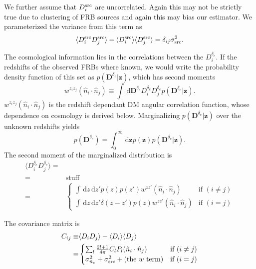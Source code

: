 \documentclass[twocolumn,prd,noshowpacs,nofootinbib,amsmath,amssymb]{revtex4}
\newcommand{\ud}{\,\mathrm{d}}
\begin{document}
We further assume that $D^{\rm src}_i$ are uncorrelated. Again this may not
be strictly true due to clustering of FRB sources and again this may bias our
estimator. We parameterized the variance from this term as 
\begin{equation}
    \langle D^{\rm src}_i D^{\rm src}_j \rangle
    - \langle D^{\rm src}_i \rangle \langle D^{\rm src}_j \rangle
    = \delta_{ij} \sigma^2_{\rm src}.
\end{equation}

The cosmological information lies in the correlations between the
$D^{\delta_e}_i$. If the redshifts of the observed FRBs where known, we
would write the probability density function of this set as
$p(\boldsymbol D^{\delta_e} | \boldsymbol z)$, which has second moments
\begin{equation}
    w^{z_i z_j}(\hat{n}_i\cdot\hat{n}_j) \equiv \int \ud \boldsymbol D^{\delta_e}
        D^{\delta_e}_i D^{\delta_e}_j p(\boldsymbol D^{\delta_e} | \boldsymbol z).
\end{equation}
$w^{z_i z_j}(\hat{n}_i\cdot\hat{n}_j)$ is the redshift dependant DM angular
correlation function, whose dependence on cosmology is derived below.
Marginalizing $p(\boldsymbol D^{\delta_e} | \boldsymbol z)$ over the unknown redshifts
yields
\begin{equation}
    p(\boldsymbol D^{\delta_e}) = \int_0^\infty \ud \boldsymbol z
        p(\boldsymbol z) p(\boldsymbol D^{\delta_e} | \boldsymbol z).
\end{equation}
The second moment of the marginalized distribution is
\begin{align}
    \langle D^{\delta_e}_i D^{\delta_e}_j \rangle =& \\
        =& \textrm{stuff} \\
        =&
        \begin{cases}
            \int \ud z \ud z' p(z) p(z') w^{z z'}(\hat{n}_i\cdot\hat{n}_j) 
                &  \text{if } (i \neq j) \\
            \int \ud z \ud z' \delta(z - z') p(z) w^{z z'}(\hat{n}_i\cdot\hat{n}_j)
                &  \text{if } (i = j)
        \end{cases}
\end{align}

The covariance matrix is
\begin{align}
    C_{ij} \equiv& \langle D_i D_j \rangle - \langle D_i \rangle \langle D_j
    \rangle\\
    =&
        \begin{cases}
            \sum_l \frac{2l+1}{4 \pi} C_l P_l(\hat{n}_i\cdot\hat{n}_j)
                &  \text{if } (i \neq j) \\
            \sigma_{\bar{n}_e}^2 + \sigma^2_{\rm src}
                + \textrm{(the $w$ term)}
                &  \text{if } (i = j)
        \end{cases}
\end{align}
\end{document}
